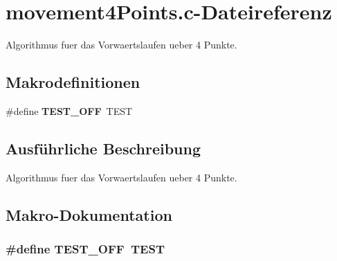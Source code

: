 \section{movement4Points.c-\/Dateireferenz}
\label{movement4_points_8c}


Algorithmus fuer das Vorwaertslaufen ueber 4 Punkte.  


\subsection*{Makrodefinitionen}
\begin{DoxyCompactItemize}
\item 
\#define {\bf TEST\_\-OFF}~TEST
\end{DoxyCompactItemize}


\subsection{Ausführliche Beschreibung}
Algorithmus fuer das Vorwaertslaufen ueber 4 Punkte. 

\subsection{Makro-\/Dokumentation}
\subsubsection[{TEST\_\-OFF}]{\setlength{\rightskip}{0pt plus 5cm}\#define TEST\_\-OFF~TEST}\label{movement4_points_8c_a8f6764e8e57eabbb14922404c0e25175}
